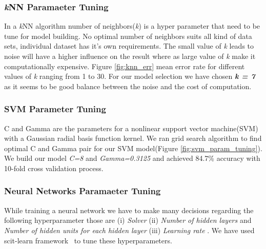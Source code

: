 \subsubsection{\textit{k}NN Paramaeter Tuning}
In a \textit{k}NN algorithm number of neighbors(\textit{k}) is a hyper parameter that need to be tune for model building. No optimal number of neighbors suits all kind of data sets, individual dataset has it's own requirements. The small value of \textit{k} leads to noise will have a higher influence on the result where as large value of \textit{k} make it computationally expensive. Figure \ref{fig:knn_err} mean error rate for different values of \textit{k} ranging from 1 to 30. For our model selection we have chosen \textbf{\textit{k = 7}} as it seems to be good balance between the noise and the cost of computation.

\begin{center}
\begin{figure}[!ht]
\end{figure}
\end{center}

\subsubsection{SVM Parameter Tuning}
C and Gamma are the parameters for a nonlinear support vector machine(SVM) with a Gaussian radial basis function kernel. We ran grid search algorithm to find optimal C and Gamma pair for our SVM model(Figure \ref{fig:svm_param_tuning}). We build our model \textit{C=8} and \textit{Gamma=0.3125} and achieved 84.7\% accuracy with 10-fold cross validation process. 

\begin{center}
\begin{figure}[!ht]
\end{figure}
\end{center}


\subsubsection{Neural Networks Paramaeter Tuning} While training a neural network we have to make many decisions regarding the following hyperparameter those are (i) \textit{Solver} (ii) \textit{Number of hidden layers} and \textit{Number of hidden units for each hidden layer} (iii) \textit{Learning rate }. We have used scit-learn framework~\cite{scite_learn_framework} to tune these hyperparameters.

